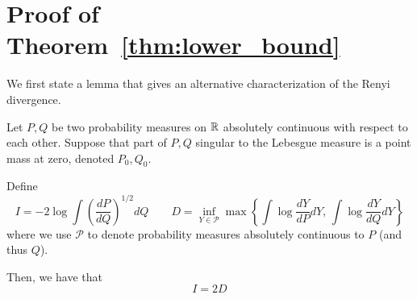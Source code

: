 \section{Proof of Theorem~\ref{thm:lower_bound}}
\label{sec:lower_bound_proof}

We first state a lemma that gives an alternative characterization of the Renyi divergence. 

\begin{lemma}
\label{lem:information_equivalence}

Let $P, Q$ be two probability measures on ${\mathbb R}$ absolutely continuous with respect to each other. Suppose that part of $P,Q$ singular to the Lebesgue measure is a point mass at zero, denoted $P_0, Q_0$. 

Define
\[
I = - 2 \log \int \left( \frac{dP}{dQ} \right)^{1/2} dQ \qquad 
D = \inf_{Y \in \mathcal{P}} \max \left\{ \int \log \frac{dY}{dP} dY, \, \int \log \frac{dY}{dQ} dY \right\}
\]
where we use $\mathcal{P}$ to denote probability measures absolutely continuous to $P$ (and thus $Q$).

Then, we have that
\[ 
I = 2 D 
\]
\end{lemma}


